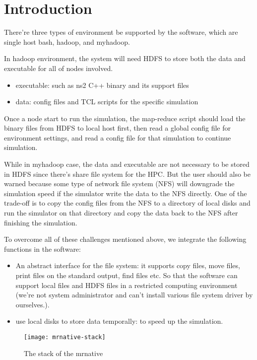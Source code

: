 %

\chapter{Introduction}

There're three types of environment be supported by the software,
which are single host bash, hadoop, and myhadoop.

In hadoop environment, the system will need HDFS to store both the data and executable for all of nodes involved.
\begin{itemize}
  \item executable: such as ns2 C++ binary and its support files
  \item data: config files and TCL scripts for the specific simulation
\end{itemize}
Once a node start to run the simulation, the map-reduce script should load the binary files from HDFS to local host first,
then read a global config file for environment settings,
and read a config file for that simulation to continue simulation.

While in myhadoop case, the data and executable are not necessary to be stored in HDFS since there's share file system for the HPC.
But the user should also be warned because some type of network file system (NFS) will downgrade the simulation speed if the simulator write the data to the NFS directly.
One of the trade-off is to copy the config files from the NFS to a directory of local disks and run the simulator on that directory and copy the data back to the NFS after finishing the simulation.

To overcome all of these challenges mentioned above,
we integrate the following functions in the software:
\begin{itemize}
  \item An abstract interface for the file system: it supports copy files, move files, print files on the standard output, find files etc. So that the software can support local files and HDFS files in a restricted computing environment (we're not system administrator and can't install various file system driver by ourselves.).
  \item use local disks to store data temporally: to speed up the simulation.
\end{itemize}

\begin{figure}\centering
  \texttt{[image: mrnative-stack]}
  \caption{The stack of the mrnative}\label{fig:mrnativestack}
\end{figure}
